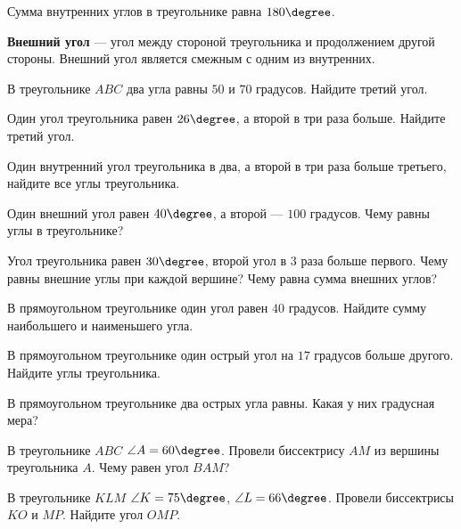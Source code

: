 \begin{class}[number=3]
	\begin{definit}
		Сумма внутренних углов в треугольнике равна \( 180\degree \).
	\end{definit}
	\begin{definit}
		\textbf{Внешний угол} --- угол между стороной треугольника и продолжением другой стороны. Внешний угол является смежным с одним из внутренних.
	\end{definit}
	\begin{listofex}
		\item В треугольнике \( ABC \) два угла равны \( 50\) и \( 70 \) градусов. Найдите третий угол.
		\item Один угол треугольника равен \( 26\degree \), а второй в три раза больше. Найдите третий угол.
		\item Один внутренний угол треугольника в два, а второй в три раза больше третьего, найдите все углы треугольника.
		\item Один внешний угол равен \( 40\degree \), а второй --- \( 100 \) градусов. Чему равны углы в треугольнике? 
		\item Угол треугольника равен \( 30\degree \), второй угол в \( 3 \) раза больше первого. Чему равны внешние углы при каждой вершине? Чему равна сумма внешних углов?
		\item В прямоугольном треугольнике один угол равен \( 40 \) градусов. Найдите сумму наибольшего и наименьшего угла. 
		\item В прямоугольном треугольнике один острый угол на \( 17 \) градусов больше другого. Найдите углы треугольника.
		\item В прямоугольном треугольнике два острых угла равны. Какая у них градусная мера?
		\item В треугольнике \( ABC \) \( \angle A=60\degree \). Провели биссектрису \( AM \) из вершины треугольника \( A \). Чему равен угол \( BAM \)?
		\item В треугольнике \( KLM \) \( \angle K=75\degree \), \(\angle L=66\degree \). Провели биссектрисы \( KO \) и \( MP \). Найдите угол \( OMP \).
	\end{listofex}
\end{class}

